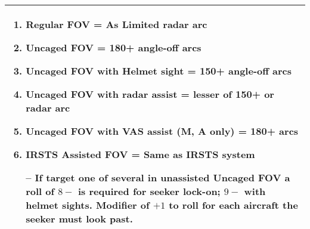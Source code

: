 \begin{onecolumntablefloat}
\begin{onecolumntable}
\medskip
\begin{tabularx}{\linewidth}{X}
\toprule
\begin{enumerate}
    \item Regular FOV = As Limited radar arc
    \item Uncaged FOV = 180+ angle-off arcs
    \item Uncaged FOV with Helmet sight = 150+ angle-off arcs
    \item Uncaged FOV with radar assist = lesser of 150+ or radar arc
    \item Uncaged FOV with VAS assist (M, A only) = 180+ arcs
    \item IRSTS Assisted FOV = Same as IRSTS system
    \medskip
    \item[--] If target one of several in unassisted Uncaged FOV a roll of $8-$ is required for seeker lock-on; $9-$ with helmet sights. Modifier of $+1$ to roll for each aircraft the seeker must look past.
\end{enumerate}
\\
\bottomrule
\end{tabularx}
\end{onecolumntable}
\end{onecolumntablefloat}
